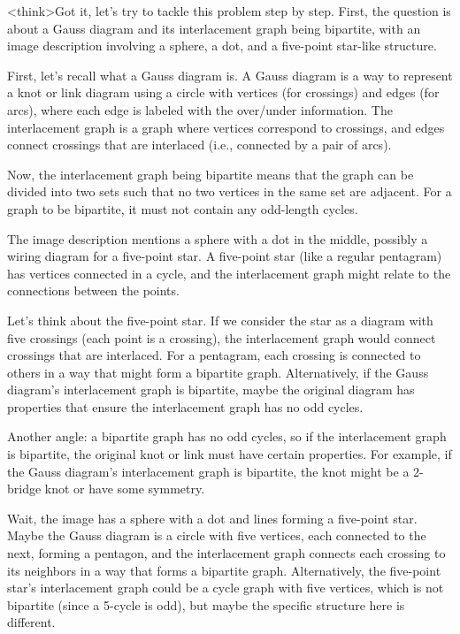<think>Got it, let's try to tackle this problem step by step. First, the question is about a Gauss diagram and its interlacement graph being bipartite, with an image description involving a sphere, a dot, and a five-point star-like structure. 

First, let's recall what a Gauss diagram is. A Gauss diagram is a way to represent a knot or link diagram using a circle with vertices (for crossings) and edges (for arcs), where each edge is labeled with the over/under information. The interlacement graph is a graph where vertices correspond to crossings, and edges connect crossings that are interlaced (i.e., connected by a pair of arcs). 

Now, the interlacement graph being bipartite means that the graph can be divided into two sets such that no two vertices in the same set are adjacent. For a graph to be bipartite, it must not contain any odd-length cycles. 

The image description mentions a sphere with a dot in the middle, possibly a wiring diagram for a five-point star. A five-point star (like a regular pentagram) has vertices connected in a cycle, and the interlacement graph might relate to the connections between the points. 

Let's think about the five-point star. If we consider the star as a diagram with five crossings (each point is a crossing), the interlacement graph would connect crossings that are interlaced. For a pentagram, each crossing is connected to others in a way that might form a bipartite graph. Alternatively, if the Gauss diagram's interlacement graph is bipartite, maybe the original diagram has properties that ensure the interlacement graph has no odd cycles. 

Another angle: a bipartite graph has no odd cycles, so if the interlacement graph is bipartite, the original knot or link must have certain properties. For example, if the Gauss diagram's interlacement graph is bipartite, the knot might be a 2-bridge knot or have some symmetry. 

Wait, the image has a sphere with a dot and lines forming a five-point star. Maybe the Gauss diagram is a circle with five vertices, each connected to the next, forming a pentagon, and the interlacement graph connects each crossing to its neighbors in a way that forms a bipartite graph. Alternatively, the five-point star's interlacement graph could be a cycle graph with five vertices, which is not bipartite (since a 5-cycle is odd), but maybe the specific structure here is different. 

